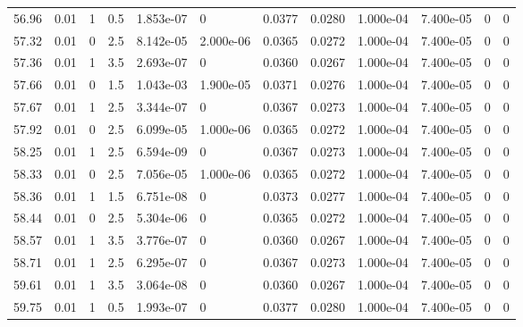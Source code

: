 \documentclass[preview]{standalone}
\begin{document}
{{{{{{\begin{tabular}{L{1.2cm}C{1.2cm} C{0.3cm}C{0.5cm} C{1.4cm}C{1.4cm} C{1.4cm}C{1.4cm} C{1.6cm}C{1.6cm} C{1.6cm}C{1.6cm}}
  56.96  &  0.01  & 1     & 0.5 &  1.853e-07  & 0  &  0.0377&   0.0280& 1.000e-04 & 7.400e-05   &  0 & 0  \\ 
  57.32  &  0.01  & 0     & 2.5 &  8.142e-05  & 2.000e-06  &  0.0365&   0.0272& 1.000e-04 & 7.400e-05   &  0 & 0  \\ 
  57.36  &  0.01  & 1     & 3.5 &  2.693e-07  & 0  &  0.0360&   0.0267& 1.000e-04 & 7.400e-05   &  0 & 0  \\ 
  57.66  &  0.01  & 0     & 1.5 &  1.043e-03  & 1.900e-05  &  0.0371&   0.0276& 1.000e-04 & 7.400e-05   &  0 & 0  \\ 
  57.67  &  0.01  & 1     & 2.5 &  3.344e-07  & 0  &  0.0367&   0.0273& 1.000e-04 & 7.400e-05   &  0 & 0  \\ 
  57.92  &  0.01  & 0     & 2.5 &  6.099e-05  & 1.000e-06  &  0.0365&   0.0272& 1.000e-04 & 7.400e-05   &  0 & 0  \\ 
  58.25  &  0.01  & 1     & 2.5 &  6.594e-09  & 0  &  0.0367&   0.0273& 1.000e-04 & 7.400e-05   &  0 & 0  \\ 
  58.33  &  0.01  & 0     & 2.5 &  7.056e-05  & 1.000e-06  &  0.0365&   0.0272& 1.000e-04 & 7.400e-05   &  0 & 0  \\ 
  58.36  &  0.01  & 1     & 1.5 &  6.751e-08  & 0  &  0.0373&   0.0277& 1.000e-04 & 7.400e-05   &  0 & 0  \\ 
  58.44  &  0.01  & 0     & 2.5 &  5.304e-06  & 0  &  0.0365&   0.0272& 1.000e-04 & 7.400e-05   &  0 & 0  \\ 
  58.57  &  0.01  & 1     & 3.5 &  3.776e-07  & 0  &  0.0360&   0.0267& 1.000e-04 & 7.400e-05   &  0 & 0  \\ 
  58.71  &  0.01  & 1     & 2.5 &  6.295e-07  & 0  &  0.0367&   0.0273& 1.000e-04 & 7.400e-05   &  0 & 0  \\ 
  59.61  &  0.01  & 1     & 3.5 &  3.064e-08  & 0  &  0.0360&   0.0267& 1.000e-04 & 7.400e-05   &  0 & 0  \\ 
  59.75  &  0.01  & 1     & 0.5 &  1.993e-07  & 0  &  0.0377&   0.0280& 1.000e-04 & 7.400e-05   &  0 & 0  \\ 
\hline 
\end{tabular} 

}}}}}}
\end{document}
